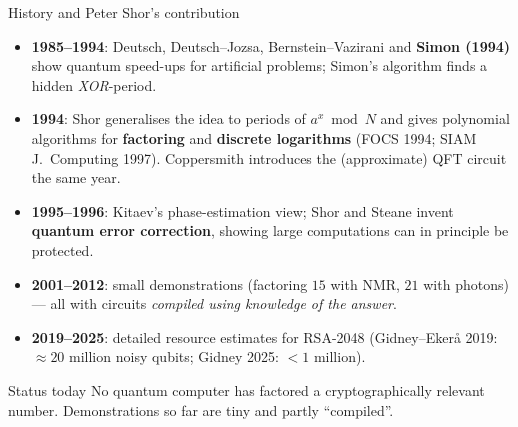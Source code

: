 \documentclass[aspectratio=169,11pt]{beamer}
\newcommand{\hl}[1]{{\color{qorange}\textbf{#1}}}
\newcommand{\key}[1]{{\color{qdark}\textbf{#1}}}
\begin{document}
\begin{frame}[label=fHistory]{History and Peter Shor's contribution}
  \small
  \begin{itemize}\itemsep2pt
    \item \key{1985--1994}: Deutsch, Deutsch--Jozsa, Bernstein--Vazirani and \key{Simon (1994)} show quantum speed-ups for artificial problems;
          Simon's algorithm finds a hidden \emph{XOR}-period.
    \item \key{1994}: Shor generalises the idea to periods of $a^x \bmod N$ and gives polynomial algorithms for \hl{factoring} and \hl{discrete logarithms}
          (FOCS 1994; SIAM J.\ Computing 1997). Coppersmith introduces the (approximate) QFT circuit the same year.
    \item \key{1995--1996}: Kitaev's phase-estimation view; Shor and Steane invent \key{quantum error correction}, showing large computations can in principle be protected.
    \item \key{2001--2012}: small demonstrations (factoring $15$ with NMR, $21$ with photons) --- all with circuits \emph{compiled using knowledge of the answer}.
    \item \key{2019--2025}: detailed resource estimates for RSA-2048 (Gidney--Ekerå 2019: $\approx20$ million noisy qubits; Gidney 2025: $< 1$ million).
  \end{itemize}
  \begin{alertblock}{Status today}
    \small No quantum computer has factored a cryptographically relevant number. Demonstrations so far are tiny and partly ``compiled''.
  \end{alertblock}
\end{frame}
\end{document}
